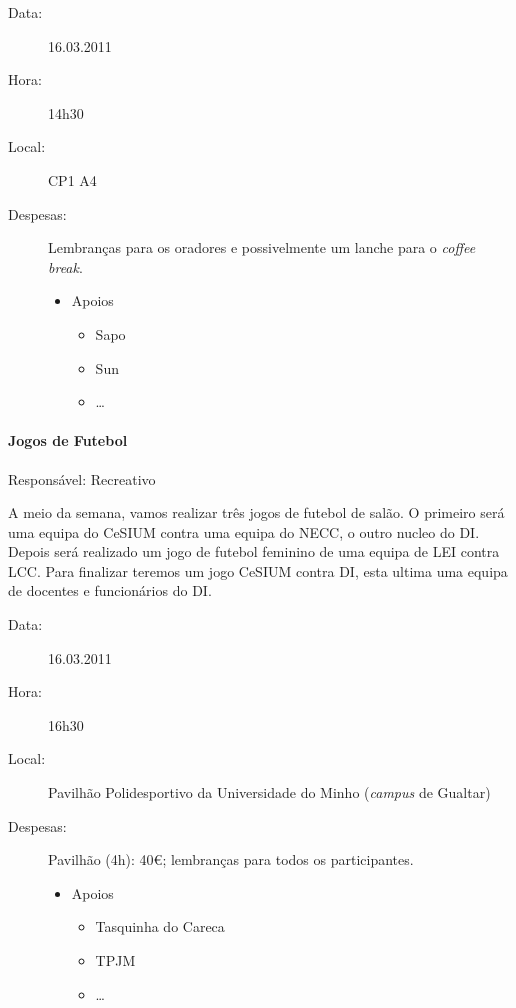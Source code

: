 \begin{description}
	\item[Data:] 16.03.2011
	\item[Hora:] 14h30
	\item[Local:] CP1 A4
	\item[Despesas:] Lembranças para os oradores e possivelmente um lanche para o \emph{coffee break}.
	\begin{itemize}
		\item Apoios
		\begin{itemize}
			\item Sapo
			\item Sun
			\item \dots  
		\end{itemize}
	\end{itemize}
\end{description}


\paragraph{Jogos de Futebol}
Responsável: Recreativo

A meio da semana, vamos realizar três jogos de futebol de salão. O primeiro será uma equipa do CeSIUM contra uma equipa do NECC, o outro nucleo do DI. Depois será realizado um jogo de futebol feminino de uma equipa de LEI contra LCC. Para finalizar teremos um jogo CeSIUM contra DI, esta ultima uma equipa de docentes e funcionários do DI.

\begin{description}
	\item[Data:] 16.03.2011
	\item[Hora:] 16h30
	\item[Local:] Pavilhão Polidesportivo da Universidade do Minho (\emph{campus} de Gualtar)
	\item[Despesas:] Pavilhão (4h): 40\euro; lembranças para todos os participantes.
	\begin{itemize}
		\item Apoios
		\begin{itemize}
			\item Tasquinha do Careca
			\item TPJM
			\item \dots  
		\end{itemize}
	\end{itemize}
\end{description}

